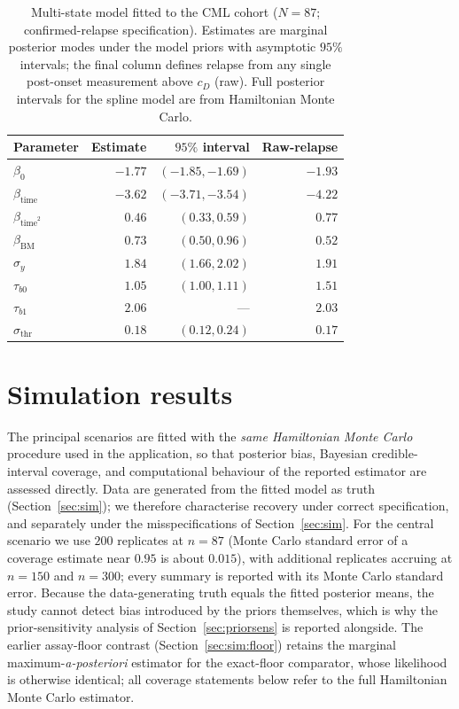 \documentclass[11pt]{article}
\begin{document}
\begin{table}[!htbp]
\centering
\caption{Multi-state model fitted to the CML cohort ($N=87$; confirmed-relapse specification). Estimates are marginal posterior modes under the model priors with asymptotic $95\%$ intervals; the final column defines relapse from any single post-onset measurement above $c_D$ (raw). Full posterior intervals for the spline model are from Hamiltonian Monte Carlo.}
\label{tab:ms-real}
\small
\begin{tabular}{lrrr}
\toprule
Parameter & Estimate & $95\%$ interval & Raw-relapse\\
\midrule
$\beta_0$ & $-1.77$ & $(-1.85,-1.69)$ & $-1.93$\\
$\beta_{\mathrm{time}}$ & $-3.62$ & $(-3.71,-3.54)$ & $-4.22$\\
$\beta_{\mathrm{time}^2}$ & $0.46$ & $(0.33,0.59)$ & $0.77$\\
$\beta_{\mathrm{BM}}$ & $0.73$ & $(0.50,0.96)$ & $0.52$\\
$\sigma_y$ & $1.84$ & $(1.66,2.02)$ & $1.91$\\
$\tau_{b0}$ & $1.05$ & $(1.00,1.11)$ & $1.51$\\
$\tau_{b1}$ & $2.06$ & --- & $2.03$\\
$\sigma_{\mathrm{thr}}$ & $0.18$ & $(0.12,0.24)$ & $0.17$\\
\bottomrule
\end{tabular}
\end{table}

\section{Simulation results}
\label{sec:simresults}

The principal scenarios are fitted with the \emph{same Hamiltonian Monte Carlo}
procedure used in the application, so that posterior bias, Bayesian
credible-interval coverage, and computational behaviour of the reported
estimator are assessed directly. Data are generated from the fitted model as
truth (Section~\ref{sec:sim}); we therefore characterise recovery under correct
specification, and separately under the misspecifications of
Section~\ref{sec:sim}. For the central scenario we use $200$ replicates at
$n=87$ (Monte Carlo standard error of a coverage estimate near $0.95$ is about
$0.015$), with additional replicates accruing at $n=150$ and $n=300$; every
summary is reported with its Monte Carlo standard error. Because the
data-generating truth equals the fitted posterior means, the study cannot
detect bias introduced by the priors themselves, which is why the
prior-sensitivity analysis of Section~\ref{sec:priorsens} is reported
alongside. The earlier assay-floor contrast (Section~\ref{sec:sim:floor})
retains the marginal maximum-\emph{a-posteriori} estimator for the exact-floor
comparator, whose likelihood is otherwise identical; all coverage statements
below refer to the full Hamiltonian Monte Carlo estimator.
\end{document}
